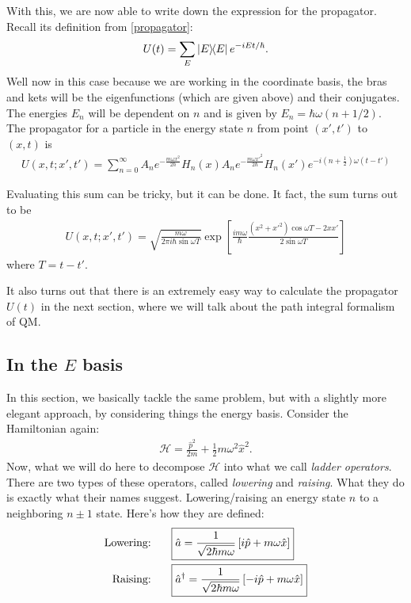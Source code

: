 \documentclass{book}
\theoremstyle{definition}
\newcommand{\ham}{\mathcal{H}}
\newcommand{\f}[2]{\frac{#1}{#2}}
\newcommand{\lp}{\left(}
\newcommand{\rp}{\right)}
\newcommand{\lb}{\left[}
\newcommand{\rb}{\right]}
\begin{document}
With this, we are now able to write down the expression for the propagator. Recall its definition from \eqref{propagator}:
\begin{align}
U(t) = \sum_E \ketbra{E}{E}e^{-iEt/\hbar}.
\end{align}
Well now in this case because we are working in the coordinate basis, the bras and kets will be the eigenfunctions (which are given above) and their conjugates. The energies $E_n$ will be dependent on $n$ and is given by $E_n = \hbar \omega(n + 1/2)$. \\

The propagator for a particle in the energy state $n$ from point $(x',t')$ to $(x,t)$ is
\begin{align}
\boxed{U(x,t;x',t') = \sum_{n=0}^\infty A_n e^{-\f{m\omega x^2}{2\hbar}} H_n(x) A_n e^{ -\f{m\omega x'^2}{2\hbar}} H_n(x')e^{-i\lp n + \f{1}{2} \rp\omega (t - t')} }
\end{align}

Evaluating this sum can be tricky, but it can be done. It fact, the sum turns out to be 
\begin{align}
\boxed{U(x,t;x',t') = \sqrt{\f{m\omega}{2\pi i\hbar \sin\omega T}} \exp \lb \f{im\omega}{\hbar} \f{(x^2 + x'^2)\cos\omega T - 2xx'}{2\sin\omega T} \rb }
\end{align}
where $T = t - t'$. 


It also turns out that there is an extremely easy way to calculate the propagator $U(t)$ in the next section, where we will talk about the path integral formalism of QM. 







\subsection{In the $E$ basis}


In this section, we basically tackle the same problem, but with a slightly more elegant approach, by considering things the energy basis. Consider the Hamiltonian again:
\begin{align}
\ham = \f{\hat{p}^2}{2m} + \f{1}{2}m\omega^2 \hat{x}^2.
\end{align}
Now, what we will do here to decompose $\ham$ into what we call \textit{ladder operators}. There are two types of these operators, called \textit{lowering} and \textit{raising}. What they do is exactly what their names suggest. Lowering/raising an energy state $n$ to a neighboring $n \pm 1$ state. Here's how they are defined:
\begin{align}
\text{Lowering: } \hspace{0.5cm} & \boxed{\hat{a} = \f{1}{\sqrt{2\hbar m\omega}} \lb  i\hat{p} + m\omega \hat{x}\rb} \\ 
\text{Raising: } \hspace{0.5cm} & \boxed{\hat{a}^\dagger = \f{1}{\sqrt{2\hbar m\omega}} \lb  - i\hat{p} + m\omega \hat{x}\rb}
\end{align}
\end{document}
